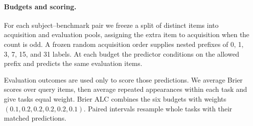 \paragraph{Budgets and scoring.} For each subject--benchmark pair we freeze a split of distinct items into acquisition and evaluation pools, assigning the extra item to acquisition when the count is odd. A frozen random acquisition order supplies nested prefixes of 0, 1, 3, 7, 15, and 31 labels. At each budget the predictor conditions on the allowed prefix and predicts the same evaluation items.

Evaluation outcomes are used only to score those predictions. We average Brier scores over query items, then average repeated appearances within each task and give tasks equal weight. Brier ALC combines the six budgets with weights $(0.1,0.2,0.2,0.2,0.2,0.1)$. Paired intervals resample whole tasks with their matched predictions.

